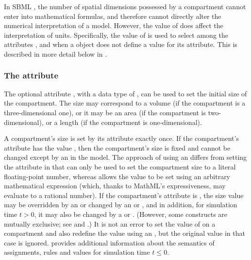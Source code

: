 In SBML \thisLV, the number of spatial dimensions possessed by a
compartment cannot enter into mathematical formulas, and therefore
cannot directly alter the numerical interpretation of a model.
However, the value of  does affect the
interpretation of units.  Specifically, the value of
 is used to select among the \Model
attributes ,  and
 when a \Compartment object does not define a
value for its  attribute.  This is described in more
detail below in .


\subsubsection{The  attribute}
\label{sec:compartment-size}
\label{sec:size}

The optional \Compartment attribute , with a data type
of , can be used to set the initial size of the
compartment.  The size may correspond to a volume (if the
compartment is a three-dimensional one), or it may be an area (if
the compartment is two-dimensional), or a length (if the
compartment is one-dimensional).

A compartment's size is set by its  attribute exactly
once.  If the compartment's attribute  has
the value , then the compartment's size is fixed
and cannot be changed except by an \InitialAssignment in the
model.  The approach of using an \InitialAssignment differs from
setting the  attribute in that  can only
be used to set the compartment size to a literal floating-point
number, whereas \InitialAssignment allows the value to be set
using an arbitrary mathematical expression (which, thanks to
MathML's expressiveness, may evaluate to a rational number).  If
the compartment's  attribute is , the
size value may be overridden by an \InitialAssignment or changed
by an \AssignmentRule or \AlgebraicRule, and in addition, for
simulation time $t > 0$, it may also be changed by a \RateRule or
\Event.  (However, some constructs are mutually exclusive; see
 and .)  It is not an
error to set the value of  on a compartment and also
redefine the value using an \InitialAssignment, but the original
 value in that case is ignored.
 provides additional information about
the semantics of assignments, rules and values for simulation time
$t \leq 0$.

